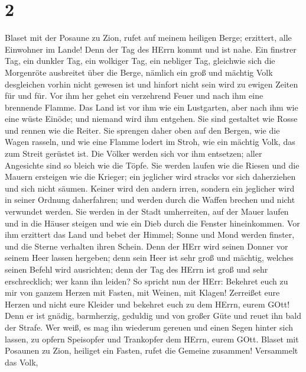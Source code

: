 \hypertarget{section-1}{%
\section{2}\label{section-1}}

 Blaset mit der Posaune zu Zion, rufet auf meinem heiligen
Berge; erzittert, alle Einwohner im Lande! Denn der Tag des HErrn kommt
und ist nahe.  Ein finstrer Tag, ein dunkler Tag, ein
wolkiger Tag, ein nebliger Tag, gleichwie sich die Morgenröte ausbreitet
über die Berge, nämlich ein groß und mächtig Volk desgleichen vorhin
nicht gewesen ist und hinfort nicht sein wird zu ewigen Zeiten für und
für.  Vor ihm her gehet ein verzehrend Feuer und nach ihm
eine brennende Flamme. Das Land ist vor ihm wie ein Lustgarten, aber
nach ihm wie eine wüste Einöde; und niemand wird ihm entgehen.
 Sie sind gestaltet wie Rosse und rennen wie die Reiter.
 Sie sprengen daher oben auf den Bergen, wie die Wagen
rasseln, und wie eine Flamme lodert im Stroh, wie ein mächtig Volk, das
zum Streit gerüstet ist.  Die Völker werden sich vor ihm
entsetzen; aller Angesichte sind so bleich wie die Töpfe. 
Sie werden laufen wie die Riesen und die Mauern ersteigen wie die
Krieger; ein jeglicher wird stracks vor sich daherziehen und sich nicht
säumen.  Keiner wird den andern irren, sondern ein jeglicher
wird in seiner Ordnung daherfahren; und werden durch die Waffen brechen
und nicht verwundet werden.  Sie werden in der Stadt
umherreiten, auf der Mauer laufen und in die Häuser steigen und wie ein
Dieb durch die Fenster hineinkommen.  Vor ihm erzittert das
Land und bebet der Himmel; Sonne und Mond werden finster, und die Sterne
verhalten ihren Schein.  Denn der HErr wird seinen Donner
vor seinem Heer lassen hergeben; denn sein Heer ist sehr groß und
mächtig, welches seinen Befehl wird ausrichten; denn der Tag des HErrn
ist groß und sehr erschrecklich; wer kann ihn leiden?  So
spricht nun der HErr: Bekehret euch zu mir von ganzem Herzen mit Fasten,
mit Weinen, mit Klagen!  Zerreißet eure Herzen und nicht
eure Kleider und bekehret euch zu dem HErrn, eurem GOtt! Denn er ist
gnädig, barmherzig, geduldig und von großer Güte und reuet ihn bald der
Strafe.  Wer weiß, es mag ihn wiederum gereuen und einen
Segen hinter sich lassen, zu opfern Speisopfer und Trankopfer dem HErrn,
eurem GOtt.  Blaset mit Posaunen zu Zion, heiliget ein
Fasten, rufet die Gemeine zusammen!  Versammelt das Volk,
